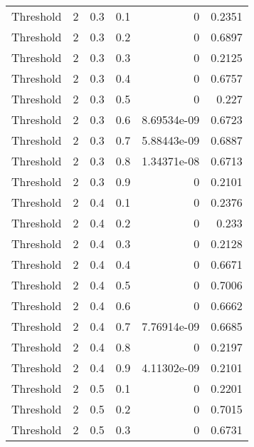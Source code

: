 \documentclass{article}
\begin{document}
\begin{longtable}[H]{lrrrrr}
 Threshold      &       2 &   0.3 &            0.1 &   0           &          0.2351 \\
 Threshold      &       2 &   0.3 &            0.2 &   0           &          0.6897 \\
 Threshold      &       2 &   0.3 &            0.3 &   0           &          0.2125 \\
 Threshold      &       2 &   0.3 &            0.4 &   0           &          0.6757 \\
 Threshold      &       2 &   0.3 &            0.5 &   0           &          0.227  \\
 Threshold      &       2 &   0.3 &            0.6 &   8.69534e-09 &          0.6723 \\
 Threshold      &       2 &   0.3 &            0.7 &   5.88443e-09 &          0.6887 \\
 Threshold      &       2 &   0.3 &            0.8 &   1.34371e-08 &          0.6713 \\
 Threshold      &       2 &   0.3 &            0.9 &   0           &          0.2101 \\
 Threshold      &       2 &   0.4 &            0.1 &   0           &          0.2376 \\
 Threshold      &       2 &   0.4 &            0.2 &   0           &          0.233  \\
 Threshold      &       2 &   0.4 &            0.3 &   0           &          0.2128 \\
 Threshold      &       2 &   0.4 &            0.4 &   0           &          0.6671 \\
 Threshold      &       2 &   0.4 &            0.5 &   0           &          0.7006 \\
 Threshold      &       2 &   0.4 &            0.6 &   0           &          0.6662 \\
 Threshold      &       2 &   0.4 &            0.7 &   7.76914e-09 &          0.6685 \\
 Threshold      &       2 &   0.4 &            0.8 &   0           &          0.2197 \\
 Threshold      &       2 &   0.4 &            0.9 &   4.11302e-09 &          0.2101 \\
 Threshold      &       2 &   0.5 &            0.1 &   0           &          0.2201 \\
 Threshold      &       2 &   0.5 &            0.2 &   0           &          0.7015 \\
 Threshold      &       2 &   0.5 &            0.3 &   0           &          0.6731 \\

\end{longtable}
\end{document}
